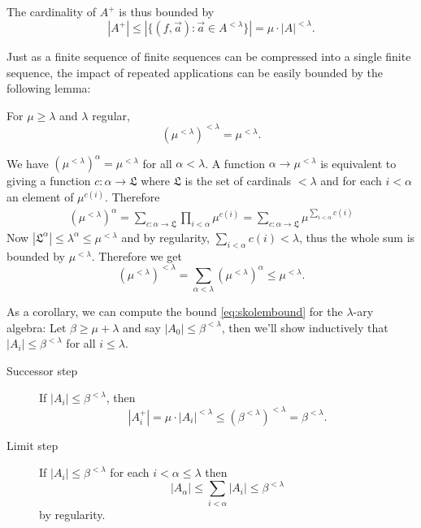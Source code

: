 The cardinality of $A^+$ is thus bounded by
\[ |A^+| \leq |\{ (f,\vec a) : \vec a \in A^{< \lambda} \}| = \mu \cdot |A|^{< \lambda}. \]

Just as a finite sequence of finite sequences can be compressed into a single finite sequence, the impact of repeated applications can be easily bounded by the following lemma:

\begin{Lemma}
For $\mu \geq \lambda$ and $\lambda$ regular, 
\[ \left(\mu^{< \lambda}\right)^{< \lambda} = \mu^{< \lambda}. \]
\end{Lemma}
\begin{Proof}
We have $(\mu^{< \lambda})^\alpha = \mu^{< \lambda}$ for all $\alpha < \lambda$. A function $\alpha \to \mu^{< \lambda}$ is equivalent to giving a function $c : \alpha \to \mathfrak L$ where $\mathfrak L$ is the set of cardinals $< \lambda$ and for each $i< \alpha$ an element of $\mu^{c(i)}$. Therefore 
\begin{align*}
(\mu^{< \lambda})^\alpha = \sum_{c : \alpha \to \mathfrak L} \prod_{i < \alpha} \mu^{c(i)} 
= \sum_{c : \alpha \to \mathfrak L} \mu^{\sum_{i < \alpha} c(i)}
\end{align*}
Now $|\mathfrak L^\alpha| \leq \lambda^\alpha \leq \mu^{< \lambda}$ and by regularity, $\sum_{i < \alpha} c(i) < \lambda$, thus the whole sum is bounded by $\mu^{< \lambda}$. Therefore we get
\[ (\mu^{< \lambda})^{< \lambda} = \sum_{\alpha < \lambda} (\mu^{< \lambda})^\alpha \leq \mu^{< \lambda}. \]
\end{Proof}

As a corollary, we can compute the bound \eqref{eq:skolembound} for the $\lambda$-ary algebra: Let $\beta \geq \mu + \lambda$ and say $|A_0| \leq \beta^{< \lambda}$, then we'll show inductively that $|A_i| \leq \beta^{< \lambda}$ for all $i \leq \lambda$.
\begin{description}
\item[Successor step] If $|A_i| \leq \beta^{< \lambda}$, then
\[ |A_i^+| = \mu \cdot |A_i|^{< \lambda} \leq \left(\beta^{< \lambda}\right)^{< \lambda} = \beta^{< \lambda}. \]
\item[Limit step] If $|A_i| \leq \beta^{< \lambda}$ for each $i < \alpha \leq \lambda$ then
\[ |A_\alpha| \leq \sum_{i < \alpha} |A_i| \leq \beta^{< \lambda} \]
by regularity.
\end{description}

